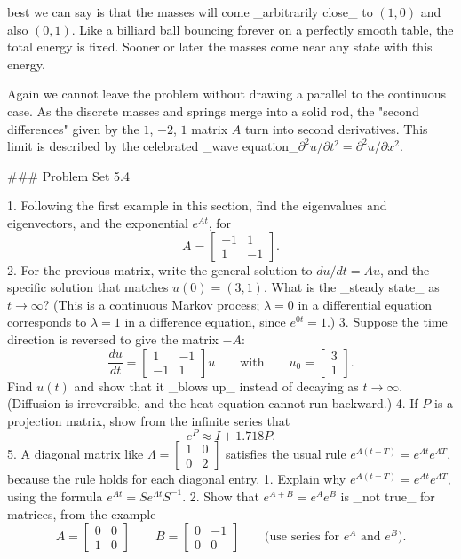 best we can say is that the masses will come _arbitrarily close_ to \((1,0)\) and also \((0,1)\). Like a billiard ball bouncing forever on a perfectly smooth table, the total energy is fixed. Sooner or later the masses come near any state with this energy.

Again we cannot leave the problem without drawing a parallel to the continuous case. As the discrete masses and springs merge into a solid rod, the "second differences" given by the \(1\), \(-2\), \(1\) matrix \(A\) turn into second derivatives. This limit is described by the celebrated _wave equation_\(\partial^{2}u/\partial t^{2}=\partial^{2}u/\partial x^{2}\).

### Problem Set 5.4

1. Following the first example in this section, find the eigenvalues and eigenvectors, and the exponential \(e^{At}\), for \[A=\begin{bmatrix}-1&1\\ 1&-1\end{bmatrix}.\]
2. For the previous matrix, write the general solution to \(du/dt=Au\), and the specific solution that matches \(u(0)=(3,1)\). What is the _steady state_ as \(t\to\infty\)? (This is a continuous Markov process; \(\lambda=0\) in a differential equation corresponds to \(\lambda=1\) in a difference equation, since \(e^{0t}=1\).)
3. Suppose the time direction is reversed to give the matrix \(-A\): \[\frac{du}{dt}=\begin{bmatrix}1&-1\\ -1&1\end{bmatrix}u\qquad\text{with}\qquad u_{0}=\begin{bmatrix}3\\ 1\end{bmatrix}.\] Find \(u(t)\) and show that it _blows up_ instead of decaying as \(t\to\infty\). (Diffusion is irreversible, and the heat equation cannot run backward.)
4. If \(P\) is a projection matrix, show from the infinite series that \[e^{P}\approx I+1.718P.\]
5. A diagonal matrix like \(\Lambda=\begin{bmatrix}1&0\\ 0&2\end{bmatrix}\) satisfies the usual rule \(e^{\Lambda(t+T)}=e^{\Lambda t}e^{\Lambda T}\), because the rule holds for each diagonal entry. 1. Explain why \(e^{A(t+T)}=e^{At}e^{\Lambda T}\), using the formula \(e^{At}=Se^{\Lambda t}S^{-1}\). 2. Show that \(e^{A+B}=e^{A}e^{B}\) is _not true_ for matrices, from the example \[A=\begin{bmatrix}0&0\\ 1&0\end{bmatrix}\qquad B=\begin{bmatrix}0&-1\\ 0&0\end{bmatrix}\qquad\text{(use series for $e^{A}$ and $e^{B}$).}\] 